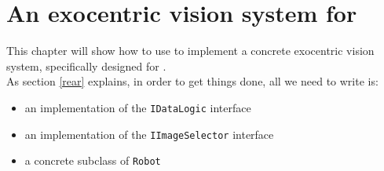 \setcounter{figure}{0}
\setcounter{table}{0}
\setcounter{lstlisting}{0}

\chapter{An exocentric vision system for \morduc{}}
\label{concr}
\minitoc

This chapter will show how to use \framework{} to implement a 
concrete exocentric vision system, specifically designed for 
\morduc{}.
\\
As section \ref{rear} explains, in order to get things 
done, all we need to write is:

\begin{itemize}
\item an implementation of the \texttt{IDataLogic} interface
\item an implementation of the \texttt{IImageSelector} interface
\item a concrete subclass of \texttt{Robot}
\end{itemize}

